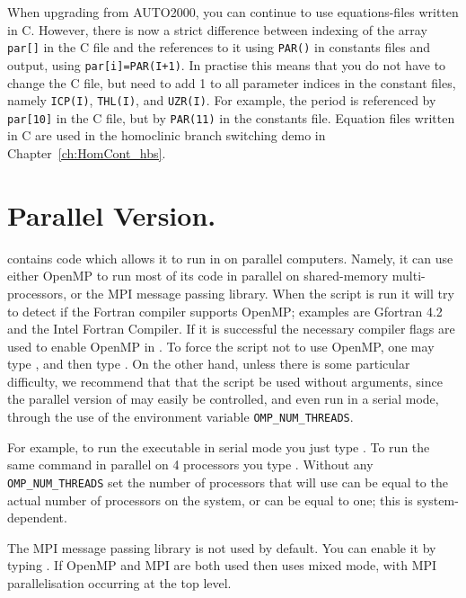 \documentclass[12pt]{report}
\begin{document}
When upgrading from {\cal AUTO2000}, you can continue to use
equations-files written in C. However, there is now a strict
difference between indexing of the array {\tt par[]} in the
C file and the references to it using {\tt PAR()} in constants
files and output, using {\tt par[i]=PAR(I+1)}. In practise this
means that you do not have to change the C file, but need to
add 1 to all parameter indices in the constant files, namely
{\tt ICP(I)}, {\tt THL(I)}, and {\tt UZR(I)}. For example,
the period is referenced by {\tt par[10]} in the C file,
but by {\tt PAR(11)} in the constants file. Equation files
written in C are used in the homoclinic branch switching
demo in Chapter~\ref{ch:HomCont_hbs}.
 
\section{Parallel Version.} \label{sec:Parallel}
\AUTO contains code which allows
it to run in on parallel computers.  Namely,
it can use either OpenMP to run most of its code in parallel
on shared-memory multi-processors, or the MPI message passing
library.
When the  script is run it will try to
detect if the Fortran compiler supports OpenMP; examples
are Gfortran 4.2 and the Intel Fortran Compiler.
If it is successful the necessary compiler flags are used
to enable OpenMP in \AUTO.
To force the  script not to use OpenMP,
one may type ,
and then type .
On the other hand, unless there is some
particular difficulty, we recommend that that the 
 script be used without arguments, since the
parallel version of \AUTO may easily be controlled,
and even run in a serial mode,  
through the use of the environment variable {\tt OMP\_NUM\_THREADS}.

For example, to run the \AUTO executable 
in serial mode you just type .
To run the same command in parallel on 4 processors you type 
. Without any {\tt OMP\_NUM\_THREADS}
set the number of processors that \AUTO will use can be equal to the
actual number of processors on the system, or can be equal to one;
this is system-dependent.

The MPI message passing library is not used by default. You can enable it
by typing  . If OpenMP and MPI are
both used then \AUTO uses mixed mode, with MPI parallelisation
occurring at the top level.
\end{document}
